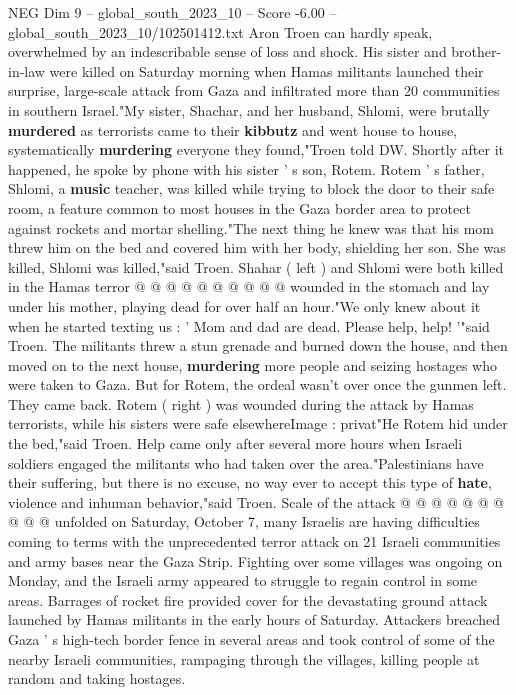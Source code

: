 \begin{textsample}{NEG Dim 9 – global\_south\_2023\_10 – Score -6.00 – global\_south\_2023\_10/102501412.txt}  \label{ex:f9_neg_364}
Aron Troen can hardly speak, overwhelmed by an indescribable sense of loss and shock.
His sister and brother-in-law were killed on Saturday morning when Hamas militants launched their surprise, large-scale attack from Gaza and infiltrated more than 20 communities in southern Israel."My sister, Shachar, and her husband, Shlomi, were brutally \textbf{murdered} as terrorists came to their \textbf{kibbutz} and went house to house, systematically \textbf{murdering} everyone they found,"Troen told DW.
Shortly after it happened, he spoke by phone with his sister ' s son, Rotem.
Rotem ' s father, Shlomi, a \textbf{music} teacher, was killed while trying to block the door to their safe room, a feature common to most houses in the Gaza border area to protect against rockets and mortar shelling."The next thing he knew was that his mom threw him on the bed and covered him with her body, shielding her son.
She was killed, Shlomi was killed,"said Troen.
Shahar ( left ) and Shlomi were both killed in the Hamas terror @ @ @ @ @ @ @ @ @ @ wounded in the stomach and lay under his mother, playing dead for over half an hour."We only knew about it when he started texting us : ' Mom and dad are dead.
Please help, help! '"said Troen.
The militants threw a stun grenade and burned down the house, and then moved on to the next house, \textbf{murdering} more people and seizing hostages who were taken to Gaza.
But for Rotem, the ordeal wasn't over once the gunmen left.
They came back.
Rotem ( right ) was wounded during the attack by Hamas terrorists, while his sisters were safe elsewhereImage : privat"He Rotem hid under the bed,"said Troen.
Help came only after several more hours when Israeli soldiers engaged the militants who had taken over the area."Palestinians have their suffering, but there is no excuse, no way ever to accept this type of \textbf{hate}, violence and inhuman behavior,"said Troen.
Scale of the attack @ @ @ @ @ @ @ @ @ @ unfolded on Saturday, October 7, many Israelis are having difficulties coming to terms with the unprecedented terror attack on 21 Israeli communities and army bases near the Gaza Strip.
Fighting over some villages was ongoing on Monday, and the Israeli army appeared to struggle to regain control in some areas.
Barrages of rocket fire provided cover for the devastating ground attack launched by Hamas militants in the early hours of Saturday.
Attackers breached Gaza ' s high-tech border fence in several areas and took control of some of the nearby Israeli communities, rampaging through the villages, killing people at random and taking hostages.

\end{textsample}
